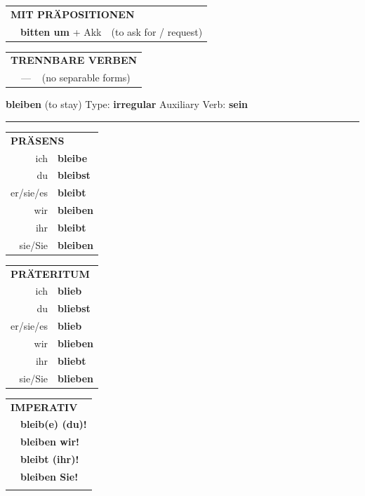\documentclass[10pt,a4paper]{revtex4-2}
\begin{document}
\begin{verbbox}
\vspace{10pt}

\begin{tabular}{lll}
\multicolumn{3}{l}{\textbf{MIT PRÄPOSITIONEN}}\\
& \textbf{bitten um} + Akk & (to ask for / request)\\
\end{tabular}
\hfill
\begin{tabular}{lll}
\multicolumn{3}{l}{\textbf{TRENNBARE VERBEN}}\\
& --- & (no separable forms)\\
\end{tabular}
\vspace{-5pt}
\end{verbbox}


\begin{verbbox}
    {\Large \bf bleiben} (to stay) \hfill Type: \textbf{irregular} \hfill Auxiliary Verb: \textbf{sein} 
    
     \vspace{5pt}

    \hrule
    
    \vspace{5pt}

  \begin{tabular}{rl}
     \multicolumn{2}{l}{\textbf{PRÄSENS} }\\
    ich & \textbf{bleibe}\\
    du & \textbf{bleibst}\\
    er/sie/es & \textbf{bleibt}\\
    wir & \textbf{bleiben}\\
    ihr & \textbf{bleibt}\\
    sie/Sie & \textbf{bleiben}\\
  \end{tabular}
  \hfill
     \begin{tabular}{rl}
    \multicolumn{2}{l}{\textbf{PRÄTERITUM} }\\
    ich & \textbf{blieb}\\
    du & \textbf{bliebst}\\
    er/sie/es & \textbf{blieb}\\
    wir & \textbf{blieben}\\
    ihr & \textbf{bliebt}\\
    sie/Sie & \textbf{blieben}\\
  \end{tabular}
  \hfill
  \begin{tabular}{rl}
     \multicolumn{2}{l}{\textbf{IMPERATIV} }\\
   & \textbf{bleib(e) (du)!}\\
   & \textbf{bleiben wir!}\\
   & \textbf{bleibt (ihr)!}\\
   & \textbf{bleiben Sie!}\\
   & \vspace{10pt}
  \end{tabular}


\end{verbbox}
\end{document}
